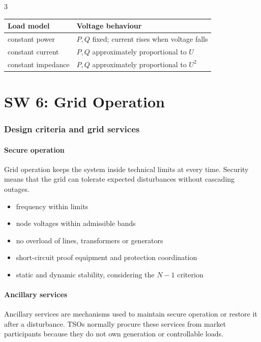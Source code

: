 \documentclass[9pt, landscape, a4paper]{article}
\begin{document}
\begin{multicols*}{3}
\begin{tabularx}{\columnwidth}{@{}lX@{}}
  \toprule
  \textbf{Load model} & \textbf{Voltage behaviour}\\
  \midrule
  constant power & $P,Q$ fixed; current rises when voltage falls\\
  constant current & $P,Q$ approximately proportional to $U$\\
  constant impedance & $P,Q$ approximately proportional to $U^2$\\
  \bottomrule
\end{tabularx}

\newcolumn
\vspace*{-.5cm}
\part{SW 6: Grid Operation}
\section{Design criteria and grid services}
\subsection{Secure operation}
Grid operation keeps the system inside technical limits at every time. Security
means that the grid can tolerate expected disturbances without cascading
outages.

\begin{itemize}
  \item frequency within limits
  \item node voltages within admissible bands
  \item no overload of lines, transformers or generators
  \item short-circuit proof equipment and protection coordination
  \item static and dynamic stability, considering the $N-1$ criterion
\end{itemize}

\subsection{Ancillary services}
Ancillary services are mechanisms used to maintain secure operation or restore
it after a disturbance. TSOs normally procure these services from market
participants because they do not own generation or controllable loads.


\end{multicols*}
\end{document}
